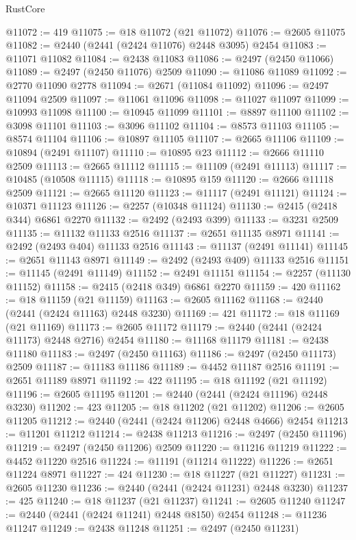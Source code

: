 \begin{lexlean}{RustCore}
\begin{coremodule}
@11072 := 419
@11075 := @18 @11072 (@21 @11072)
@11076 := @2605 @11075
@11082 := @2440 (@2441 (@2424 @11076) @2448 @3095) @2454
@11083 := @11071 @11082
@11084 := @2438 @11083
@11086 := @2497 (@2450 @11066)
@11089 := @2497 (@2450 @11076) @2509
@11090 := @11086 @11089
@11092 := @2770 @11090 @2778
@11094 := @2671 (@11084 @11092)
@11096 := @2497 @11094 @2509
@11097 := @11061 @11096
@11098 := @11027 @11097
@11099 := @10993 @11098
@11100 := @10945 @11099
@11101 := @8897 @11100
@11102 := @3098 @11101
@11103 := @3096 @11102
@11104 := @8573 @11103
@11105 := @8574 @11104
@11106 := @10897 @11105
@11107 := @2665 @11106
@11109 := @10894 (@2491 @11107)
@11110 := @10895 @23
@11112 := @2666 @11110 @2509
@11113 := @2665 @11112
@11115 := @11109 (@2491 @11113)
@11117 := @10485 (@10508 @11115)
@11118 := @10895 @159
@11120 := @2666 @11118 @2509
@11121 := @2665 @11120
@11123 := @11117 (@2491 @11121)
@11124 := @10371 @11123
@11126 := @2257 (@10348 @11124)
@11130 := @2415 (@2418 @344) @6861 @2270
@11132 := @2492 (@2493 @399)
@11133 := @3231 @2509
@11135 := @11132 @11133 @2516
@11137 := @2651 @11135 @8971
@11141 := @2492 (@2493 @404) @11133 @2516
@11143 := @11137 (@2491 @11141)
@11145 := @2651 @11143 @8971
@11149 := @2492 (@2493 @409) @11133 @2516
@11151 := @11145 (@2491 @11149)
@11152 := @2491 @11151
@11154 := @2257 (@11130 @11152)
@11158 := @2415 (@2418 @349) @6861 @2270
@11159 := 420
@11162 := @18 @11159 (@21 @11159)
@11163 := @2605 @11162
@11168 := @2440 (@2441 (@2424 @11163) @2448 @3230)
@11169 := 421
@11172 := @18 @11169 (@21 @11169)
@11173 := @2605 @11172
@11179 := @2440 (@2441 (@2424 @11173) @2448 @2716) @2454
@11180 := @11168 @11179
@11181 := @2438 @11180
@11183 := @2497 (@2450 @11163)
@11186 := @2497 (@2450 @11173) @2509
@11187 := @11183 @11186
@11189 := @4452 @11187 @2516
@11191 := @2651 @11189 @8971
@11192 := 422
@11195 := @18 @11192 (@21 @11192)
@11196 := @2605 @11195
@11201 := @2440 (@2441 (@2424 @11196) @2448 @3230)
@11202 := 423
@11205 := @18 @11202 (@21 @11202)
@11206 := @2605 @11205
@11212 := @2440 (@2441 (@2424 @11206) @2448 @4666) @2454
@11213 := @11201 @11212
@11214 := @2438 @11213
@11216 := @2497 (@2450 @11196)
@11219 := @2497 (@2450 @11206) @2509
@11220 := @11216 @11219
@11222 := @4452 @11220 @2516
@11224 := @11191 (@11214 @11222)
@11226 := @2651 @11224 @8971
@11227 := 424
@11230 := @18 @11227 (@21 @11227)
@11231 := @2605 @11230
@11236 := @2440 (@2441 (@2424 @11231) @2448 @3230)
@11237 := 425
@11240 := @18 @11237 (@21 @11237)
@11241 := @2605 @11240
@11247 := @2440 (@2441 (@2424 @11241) @2448 @8150) @2454
@11248 := @11236 @11247
@11249 := @2438 @11248
@11251 := @2497 (@2450 @11231)

\end{coremodule}
\end{lexlean}
